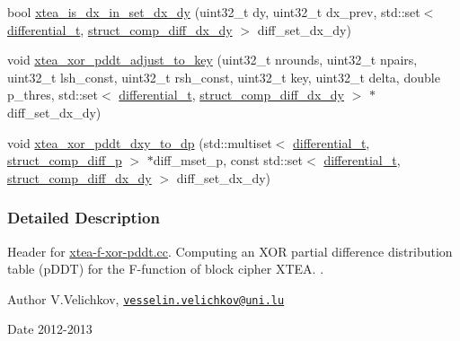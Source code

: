 \begin{DoxyCompactItemize}
\item 
bool \hyperlink{xtea-f-xor-pddt_8hh_a2bd3a0eacc4915a2812e472f63d8f8f0}{xtea\-\_\-is\-\_\-dx\-\_\-in\-\_\-set\-\_\-dx\-\_\-dy} (uint32\-\_\-t dy, uint32\-\_\-t dx\-\_\-prev, std\-::set$<$ \hyperlink{structdifferential__t}{differential\-\_\-t}, \hyperlink{structstruct__comp__diff__dx__dy}{struct\-\_\-comp\-\_\-diff\-\_\-dx\-\_\-dy} $>$ diff\-\_\-set\-\_\-dx\-\_\-dy)
\item 
void \hyperlink{xtea-f-xor-pddt_8hh_a2bfe2f1348b48d45e79183f2c8582a65}{xtea\-\_\-xor\-\_\-pddt\-\_\-adjust\-\_\-to\-\_\-key} (uint32\-\_\-t nrounds, uint32\-\_\-t npairs, uint32\-\_\-t lsh\-\_\-const, uint32\-\_\-t rsh\-\_\-const, uint32\-\_\-t key, uint32\-\_\-t delta, double p\-\_\-thres, std\-::set$<$ \hyperlink{structdifferential__t}{differential\-\_\-t}, \hyperlink{structstruct__comp__diff__dx__dy}{struct\-\_\-comp\-\_\-diff\-\_\-dx\-\_\-dy} $>$ $\ast$diff\-\_\-set\-\_\-dx\-\_\-dy)
\item 
void \hyperlink{xtea-f-xor-pddt_8hh_ab30446d80d0a70a87e3bc306b072c176}{xtea\-\_\-xor\-\_\-pddt\-\_\-dxy\-\_\-to\-\_\-dp} (std\-::multiset$<$ \hyperlink{structdifferential__t}{differential\-\_\-t}, \hyperlink{structstruct__comp__diff__p}{struct\-\_\-comp\-\_\-diff\-\_\-p} $>$ $\ast$diff\-\_\-mset\-\_\-p, const std\-::set$<$ \hyperlink{structdifferential__t}{differential\-\_\-t}, \hyperlink{structstruct__comp__diff__dx__dy}{struct\-\_\-comp\-\_\-diff\-\_\-dx\-\_\-dy} $>$ diff\-\_\-set\-\_\-dx\-\_\-dy)
\end{DoxyCompactItemize}


\subsubsection{\-Detailed \-Description}
\-Header for \hyperlink{xtea-f-xor-pddt_8cc}{xtea-\/f-\/xor-\/pddt.\-cc}. \-Computing an \-X\-O\-R partial difference distribution table (p\-D\-D\-T) for the \-F-\/function of block cipher \-X\-T\-E\-A. . \begin{DoxyAuthor}{\-Author}
\-V.\-Velichkov, \href{mailto:vesselin.velichkov@uni.lu}{\tt vesselin.\-velichkov@uni.\-lu} 
\end{DoxyAuthor}
\begin{DoxyDate}{\-Date}
2012-\/2013 
\end{DoxyDate}


